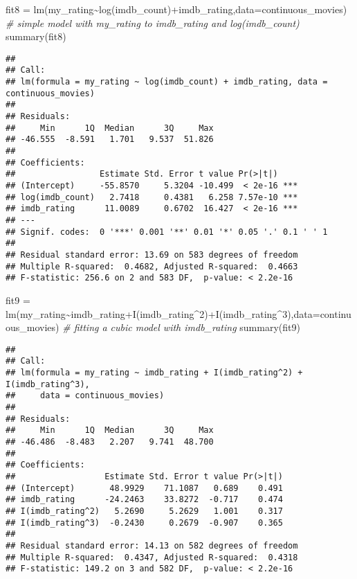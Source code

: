 \documentclass[
]{article}
\newenvironment{Shaded}{\begin{snugshade}}{\end{snugshade}}
\newcommand{\AttributeTok}[1]{\textcolor[rgb]{0.77,0.63,0.00}{#1}}
\newcommand{\CommentTok}[1]{\textcolor[rgb]{0.56,0.35,0.01}{\textit{#1}}}
\newcommand{\DecValTok}[1]{\textcolor[rgb]{0.00,0.00,0.81}{#1}}
\newcommand{\FunctionTok}[1]{\textcolor[rgb]{0.00,0.00,0.00}{#1}}
\newcommand{\NormalTok}[1]{#1}
\newcommand{\OtherTok}[1]{\textcolor[rgb]{0.56,0.35,0.01}{#1}}
\newcommand{\SpecialCharTok}[1]{\textcolor[rgb]{0.00,0.00,0.00}{#1}}
\begin{document}
\begin{Shaded}
\begin{Highlighting}[]
\NormalTok{fit8 }\OtherTok{=} \FunctionTok{lm}\NormalTok{(my\_rating}\SpecialCharTok{\textasciitilde{}}\FunctionTok{log}\NormalTok{(imdb\_count)}\SpecialCharTok{+}\NormalTok{imdb\_rating,}\AttributeTok{data=}\NormalTok{continuous\_movies) }\CommentTok{\# simple model with my\_rating to imdb\_rating and log(imdb\_count)}
\FunctionTok{summary}\NormalTok{(fit8)}
\end{Highlighting}
\end{Shaded}

\begin{verbatim}
## 
## Call:
## lm(formula = my_rating ~ log(imdb_count) + imdb_rating, data = continuous_movies)
## 
## Residuals:
##     Min      1Q  Median      3Q     Max 
## -46.555  -8.591   1.701   9.537  51.826 
## 
## Coefficients:
##                 Estimate Std. Error t value Pr(>|t|)    
## (Intercept)     -55.8570     5.3204 -10.499  < 2e-16 ***
## log(imdb_count)   2.7418     0.4381   6.258 7.57e-10 ***
## imdb_rating      11.0089     0.6702  16.427  < 2e-16 ***
## ---
## Signif. codes:  0 '***' 0.001 '**' 0.01 '*' 0.05 '.' 0.1 ' ' 1
## 
## Residual standard error: 13.69 on 583 degrees of freedom
## Multiple R-squared:  0.4682, Adjusted R-squared:  0.4663 
## F-statistic: 256.6 on 2 and 583 DF,  p-value: < 2.2e-16
\end{verbatim}

\begin{Shaded}
\begin{Highlighting}[]
\NormalTok{fit9 }\OtherTok{=} \FunctionTok{lm}\NormalTok{(my\_rating}\SpecialCharTok{\textasciitilde{}}\NormalTok{imdb\_rating}\SpecialCharTok{+}\FunctionTok{I}\NormalTok{(imdb\_rating}\SpecialCharTok{\^{}}\DecValTok{2}\NormalTok{)}\SpecialCharTok{+}\FunctionTok{I}\NormalTok{(imdb\_rating}\SpecialCharTok{\^{}}\DecValTok{3}\NormalTok{),}\AttributeTok{data=}\NormalTok{continuous\_movies) }\CommentTok{\# fitting a cubic model with imdb\_rating}
\FunctionTok{summary}\NormalTok{(fit9)}
\end{Highlighting}
\end{Shaded}

\begin{verbatim}
## 
## Call:
## lm(formula = my_rating ~ imdb_rating + I(imdb_rating^2) + I(imdb_rating^3), 
##     data = continuous_movies)
## 
## Residuals:
##     Min      1Q  Median      3Q     Max 
## -46.486  -8.483   2.207   9.741  48.700 
## 
## Coefficients:
##                  Estimate Std. Error t value Pr(>|t|)
## (Intercept)       48.9929    71.1087   0.689    0.491
## imdb_rating      -24.2463    33.8272  -0.717    0.474
## I(imdb_rating^2)   5.2690     5.2629   1.001    0.317
## I(imdb_rating^3)  -0.2430     0.2679  -0.907    0.365
## 
## Residual standard error: 14.13 on 582 degrees of freedom
## Multiple R-squared:  0.4347, Adjusted R-squared:  0.4318 
## F-statistic: 149.2 on 3 and 582 DF,  p-value: < 2.2e-16
\end{verbatim}
\end{document}
